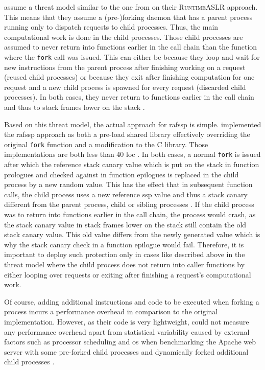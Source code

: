  assume a threat model similar to the one from \citeauthor{Lu2016} on their \textsc{RuntimeASLR} approach.
This means that they assume a (pre-)forking daemon that has a parent process running only to dispatch requests to child processes.
Thus, the main computational work is done in the child processes.
Those child processes are assumed to never return into functions earlier in the call chain than the function where the \texttt{fork} call was issued.
This can either be because they loop and wait for new instructions from the parent process after finishing working on a request (reused child processes) or because they exit after finishing computation for one request and a new child process is spawned for every request (discarded child processes).
In both cases, they never return to functions earlier in the call chain and thus to stack frames lower on the stack \cite[245\psq]{MarcoGisbert2013}.

Based on this threat model, the actual approach for \gls{rafssp} is simple.
 implemented the \gls{rafssp} approach as both a pre-load shared library effectively overriding the original \texttt{fork} function and a modification to the C library.
Those implementations are both less than 40 \gls{loc} \cite[247]{MarcoGisbert2013}.
In both cases, a normal \texttt{fork} is issued after which the reference stack canary value which is put on the stack in function prologues and checked against in function epilogues is replaced in the child process by a new random value.
This has the effect that in subsequent function calls, the child process uses a new reference \gls{ssp} value and thus a stack canary different from the parent process, child or sibling processes \cite[245\psqq]{MarcoGisbert2013}.
If the child process was to return into functions earlier in the call chain, the process would crash, as the stack canary value in stack frames lower on the stack still contain the old stack canary value.
This old value differs from the newly generated value which is why the stack canary check in a function epilogue would fail.
Therefore, it is important to deploy such protection only in cases like described above in the threat model where the child process does not return into caller functions by either looping over requests or exiting after finishing a request's computational work.

Of course, adding additional instructions and code to be executed when forking a process incurs a performance overhead in comparison to the original implementation.
However, as their code is very lightweight, \citeauthor{MarcoGisbert2013} could not measure any performance overhead apart from statistical variability caused by external factors such as processor scheduling and \gls{os} when benchmarking the Apache web server with some pre-forked child processes and dynamically forked additional child processes \cite[249\psq]{MarcoGisbert2013}.

